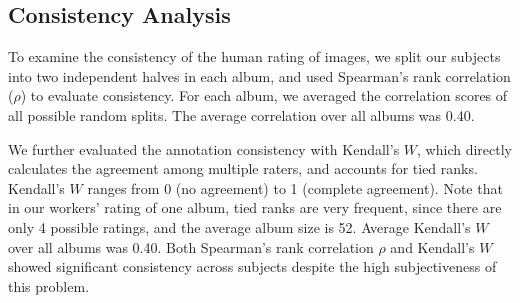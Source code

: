 \documentclass[10pt,twocolumn,letterpaper]{article}
\begin{document}


\subsection{Consistency Analysis}
\label{consistency_section}

To examine the consistency of the human rating of images, we split our subjects into two independent halves in each album, and used Spearman's rank correlation ($\rho$) to evaluate consistency. For each album, we averaged the correlation scores of all possible random splits. The average correlation over all albums was 0.40. 

We further evaluated the annotation consistency with Kendall's $W$, which directly calculates the agreement among multiple raters, and accounts for tied ranks. Kendall's $W$ ranges from 0 (no agreement) to 1 (complete agreement). Note that in our workers' rating of one album, tied ranks are very frequent, since there are only 4 possible ratings, and the average album size is 52. Average Kendall's $W$ over all albums was 0.40. Both Spearman's rank correlation $\rho$ and Kendall's $W$ showed significant consistency across subjects despite the high subjectiveness of this problem.
\end{document}
